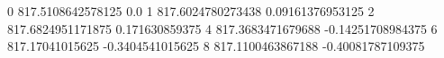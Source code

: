 0 817.5108642578125 0.0
1 817.6024780273438 0.09161376953125
2 817.6824951171875 0.171630859375
4 817.3683471679688 -0.14251708984375
6 817.17041015625 -0.3404541015625
8 817.1100463867188 -0.40081787109375
